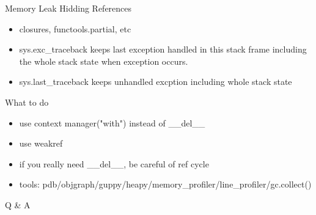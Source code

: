 \documentclass[xcolor=svgnames]{beamer}
\begin{document}
\begin{frame}{Memory Leak}
Hidding References
\begin{itemize}
  \item closures, functools.partial, etc
  \item sys.exc\_traceback keeps last exception handled in this stack frame including the whole stack state when exception occurs.
  \item sys.last\_traceback keeps unhandled excption including whole stack state
\end{itemize}
\end{frame}

\begin{frame}{What to do}
\begin{itemize}
    \item use context manager("with") instead of \_\_del\_\_
    \item use weakref
    \item if you really need \_\_del\_\_, be careful of ref cycle
    \item tools: pdb/objgraph/guppy/heapy/memory\_profiler/line\_profiler/gc.collect()
\end{itemize}
\end{frame}

\begin{frame}[c]{} %
    \begin{center}\Huge
        Q \& A
    \end{center}
\end{frame} 
\end{document}
